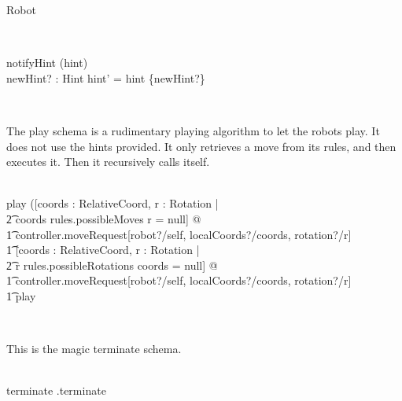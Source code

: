 \begin{class}{Robot}
\begin{zpar}
\end{zpar} \\
\begin{schema}{notifyHint}
\Delta (hint) \\
newHint? : Hint
\where
hint' = hint \cup \{newHint?\}
\end{schema} \\
\znewpage
\begin{zpar}
The play schema is a rudimentary playing algorithm to let the robots play. It does not use the hints provided. It only retrieves a move from its rules, and then executes it. Then it recursively calls itself.
\end{zpar} \\
play \sdef ([coords : RelativeCoord, r : Rotation | \\ \t2 coords \in rules.possibleMoves \wedge r = null] @ \\ \t1 controller.moveRequest[robot?/self, localCoords?/coords, rotation?/r] \; \; [] \\ \t1
[coords : RelativeCoord, r : Rotation | \\ \t2 r \in rules.possibleRotations \wedge coords = null] @ \\ \t1 controller.moveRequest[robot?/self, localCoords?/coords, rotation?/r] \; \; \comp \\ \t1 play
\begin{zpar}
\end{zpar} \\
\begin{zpar}
This is the magic terminate schema.
\end{zpar} \\
terminate \sdef {}.terminate
\end{class}


